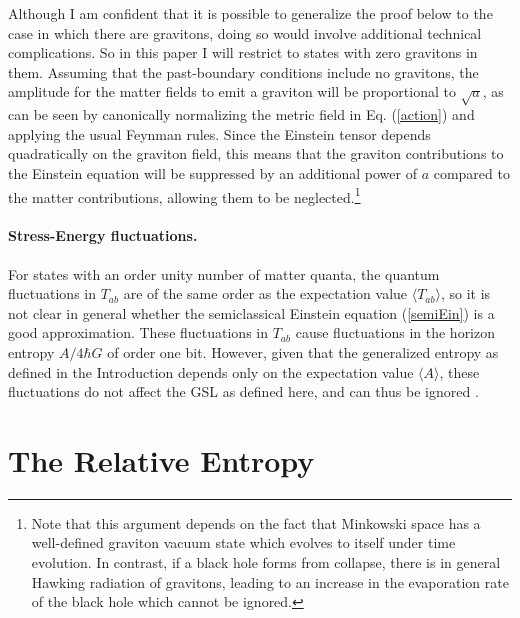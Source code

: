 \documentclass{article}
\begin{document}
Although I am confident that it is possible to generalize the proof below to the case in which there are gravitons, doing so would involve additional technical complications.  So in this paper I will restrict to states with zero gravitons in them.  Assuming that the past-boundary conditions include no gravitons, the amplitude for the matter fields to emit a graviton will be proportional to $\sqrt{a}$, as can be seen by canonically normalizing the metric field in Eq. (\ref{action}) and applying the usual Feynman rules.  Since the Einstein tensor depends quadratically on the graviton field, this means that the graviton contributions to the Einstein equation will be suppressed by an additional power of $a$ compared to the matter contributions, allowing them to be neglected.\footnote{Note that this argument depends on the fact that Minkowski space has a well-defined graviton vacuum state which evolves to itself under time evolution.  In contrast, if a black hole forms from collapse, there is in general Hawking radiation of gravitons, leading to an increase in the evaporation rate of the black hole which cannot be ignored.}

\paragraph{\textbf{Stress-Energy fluctuations.}}  For states with an order unity number of matter quanta, the quantum fluctuations in $T_{ab}$ are of the same order as the expectation value $\langle T_{ab} \rangle$, so it is not clear in general whether the semiclassical Einstein equation (\ref{semiEin}) is a good approximation.  These fluctuations in $T_{ab}$ cause fluctuations in the horizon entropy $A / 4\hbar G$ of order one bit.  However, given that the generalized entropy as defined in the Introduction depends only on the expectation value $\langle A \rangle$, these fluctuations do not affect the GSL as defined here, and can thus be ignored \cite{10proofs}.

\section{The Relative Entropy}\label{rel}
\end{document}
